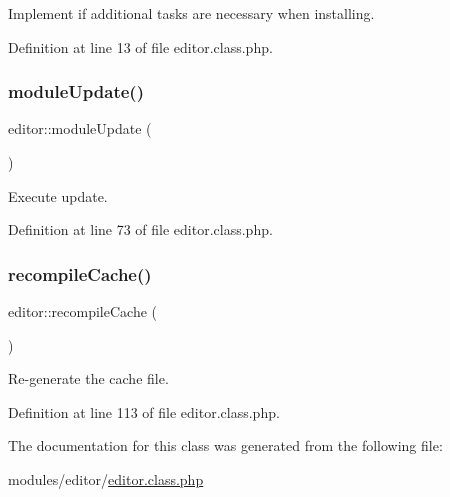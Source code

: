 Implement if additional tasks are necessary when installing. 



Definition at line 13 of file editor.\+class.\+php.

\mbox{\label{classeditor_a34fed67c964b594c9f30d52c3da5978c}} 
\subsubsection{\texorpdfstring{module\+Update()}{moduleUpdate()}}
{\footnotesize\ttfamily editor\+::module\+Update (\begin{DoxyParamCaption}{ }\end{DoxyParamCaption})}



Execute update. 



Definition at line 73 of file editor.\+class.\+php.

\mbox{\label{classeditor_a0d96c544cee01a5c733a7c0b7def14e2}} 
\subsubsection{\texorpdfstring{recompile\+Cache()}{recompileCache()}}
{\footnotesize\ttfamily editor\+::recompile\+Cache (\begin{DoxyParamCaption}{ }\end{DoxyParamCaption})}



Re-\/generate the cache file. 



Definition at line 113 of file editor.\+class.\+php.



The documentation for this class was generated from the following file\+:\begin{DoxyCompactItemize}
\item 
modules/editor/\hyperlink{editor_8class_8php}{editor.\+class.\+php}\end{DoxyCompactItemize}
